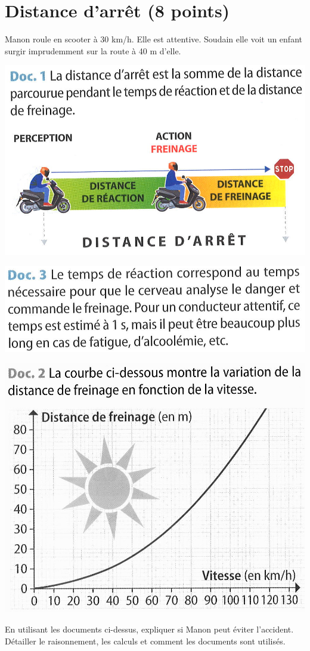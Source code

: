 \section{Distance d'arrêt (8 points)}

Manon roule en scooter à 30 km/h. Elle est attentive. Soudain elle voit un enfant surgir imprudemment sur la route à 40 m d'elle.

\begin{multicols}{2}
	\includegraphics[scale=0.3]{dist_doc1}
	
	\includegraphics[scale=0.9]{dist_doc3}
	
	
	\includegraphics[scale=0.3]{dist_doc2_3}		
\end{multicols}

\begin{questions}
	\question[8] En utilisant les documents ci-dessus, expliquer si Manon peut éviter l'accident.  Détailler le raisonnement, les calculs et comment les documents sont utilisés.
	
	\fillwithdottedlines{12cm}
\end{questions}





